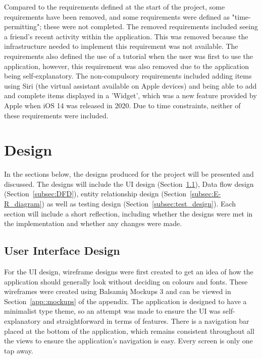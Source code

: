         Compared to the requirements defined at the start of the project, some requirements have been removed, and some requirements were defined as "time-permitting"; these were not completed.  The removed requirements included seeing a friend's recent activity within the application. This was removed because the infrastructure needed to implement this requirement was not available.  The requirements also defined the use of a tutorial when the user was first to use the application, however, this requirement was also removed due to the application being self-explanatory.  The non-compulsory requirements included adding items using Siri (the virtual assistant available on Apple devices) and being able to add and complete items displayed in a 'Widget', which was a new feature provided by Apple when iOS 14 was released in 2020.  Due to time constraints, neither of these requirements were included.
        
    \section{Design}
        \label{sec:deliverables_design}
        In the sections below, the designs produced for the project will be presented and discussed.  The designs will include the UI design (Section~\ref{subsec:UI_design}), Data flow design (Section~\ref{subsec:DFD}), entity relationship design (Section~\ref{subsec:E-R_diagram}) as well as testing design (Section~\ref{subsec:test_design}).  Each section will include a short reflection, including whether the designs were met in the implementation and whether any changes were made.
        
        \subsection{User Interface Design}
        \label{subsec:UI_design}
        For the UI design, wireframe designs were first created to get an idea of how the application should generally look without deciding on colours and fonts.  These wireframes were created using Balsamiq Mockups 3 and can be viewed in Section~\ref{app::mockups} of the appendix.  The application is designed to have a minimalist type theme, so an attempt was made to ensure the UI was self-explanatory and straightforward in terms of features.  There is a navigation bar placed at the bottom of the application, which remains consistent throughout all the views to ensure the application's navigation is easy. Every screen is only one tap away.
        
